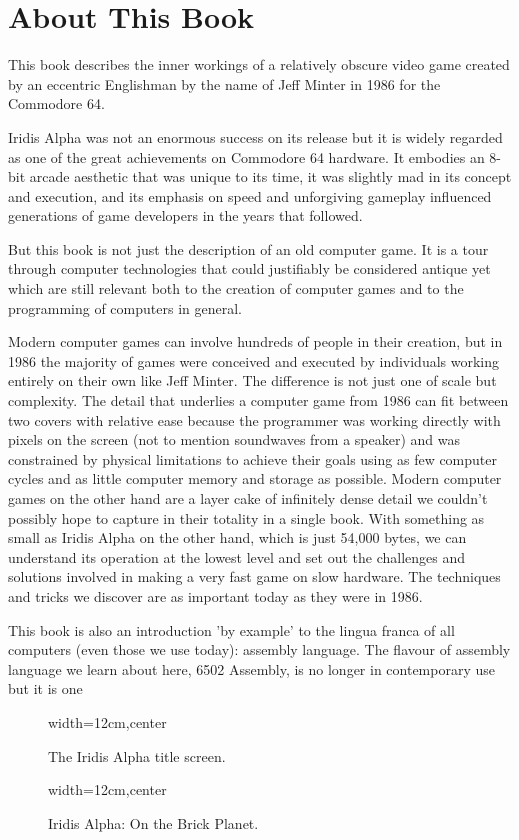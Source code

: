 \chapter*{About This Book} 
This book describes the inner workings of a relatively obscure video game created
by an eccentric Englishman by the name of Jeff Minter in 1986 for the Commodore 64.

Iridis Alpha was not an enormous success on its release but it is widely regarded as
one of the great achievements on Commodore 64 hardware. It embodies an
8-bit arcade aesthetic that was unique to its time, it was slightly mad in its
concept and execution, and its emphasis on speed and unforgiving gameplay
influenced generations of game developers in the years that followed.

But this book is not just the description of an old computer game. 
It is a tour through computer technologies that could justifiably be considered
antique yet which are still relevant both to the creation of 
computer games and to the programming of computers in general.

Modern computer games can involve hundreds of people in their creation, but in 
1986 the majority of games were conceived and executed by individuals working
entirely on their own like Jeff Minter. The difference is not just one of scale but complexity.
The detail that underlies a computer game from 1986 can fit between two covers
with relative ease because the programmer was working directly with pixels on the
screen (not to mention soundwaves from a speaker) and was constrained by physical
limitations to achieve their goals using as few computer cycles and as little
computer memory and storage as possible. Modern computer games on the other hand are a layer cake
of infinitely dense detail we couldn't possibly hope to capture in their totality
in a single book. With something as small as Iridis Alpha on the other hand,
which is just 54,000 bytes, we can 
understand its operation at the lowest level and set out the challenges and
solutions involved in making a very fast game on slow hardware. The techniques and
tricks we discover are as important today as they were in 1986.

This book is also an introduction 'by example' to the lingua franca of all computers
(even those we use today): assembly language. The flavour of assembly language we learn about here,
6502 Assembly, is no longer in contemporary use but it is one 

\clearpage
\begin{figure}[H]
  {
    \begin{adjustbox}{width=12cm,center}
    \end{adjustbox}
  }\caption*{The Iridis Alpha title screen.}
\end{figure}
\vspace{-0.5cm}
\begin{figure}[H]
  {
    \begin{adjustbox}{width=12cm,center}
    \end{adjustbox}
  }\caption*{Iridis Alpha: On the Brick Planet.}
\end{figure}
\clearpage

